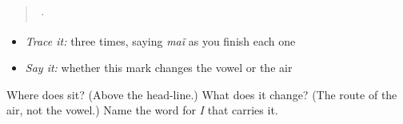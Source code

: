 \begin{quote}
  ·  
\end{quote}

\begin{itemize}
\raggedright
  \item \emph{Trace it:}  three times, saying \emph{maĩ} as you finish each one
  \item \emph{Say it:} whether this mark changes the vowel or the air
\end{itemize}

\begin{tcolorbox}[breakable,colback=teal!4,colframe=teal!35!black,title={Before you move on}]
Where does \textbf{} sit? (Above the head-line.) What does it change? (The route of the air, not the vowel.) Name the word for \emph{I} that carries it.
\end{tcolorbox}
